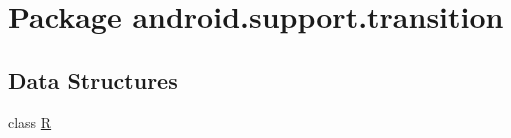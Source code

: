 \hypertarget{namespaceandroid_1_1support_1_1transition}{}\section{Package android.\+support.\+transition}
\label{namespaceandroid_1_1support_1_1transition}
\subsection*{Data Structures}
\begin{DoxyCompactItemize}
\item 
class \mbox{\hyperlink{classandroid_1_1support_1_1transition_1_1_r}{R}}
\end{DoxyCompactItemize}
